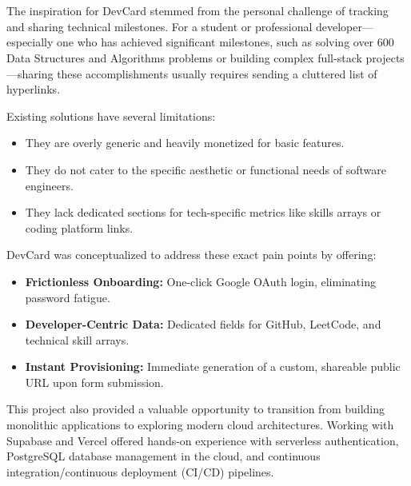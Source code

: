 \documentclass[12pt,a4paper]{report}     %
\begin{document}
\chapter{}
\begin{normalsize}

The inspiration for DevCard stemmed from the personal challenge of tracking and sharing technical milestones. For a student or professional developer—especially one who has achieved significant milestones, such as solving over 600 Data Structures and Algorithms problems or building complex full-stack projects—sharing these accomplishments usually requires sending a cluttered list of hyperlinks. 

Existing solutions have several limitations:

\begin{itemize}
    \item They are overly generic and heavily monetized for basic features.
    \item They do not cater to the specific aesthetic or functional needs of software engineers.
    \item They lack dedicated sections for tech-specific metrics like skills arrays or coding platform links.
\end{itemize}

DevCard was conceptualized to address these exact pain points by offering:

\begin{itemize}
    \item \textbf{Frictionless Onboarding:} One-click Google OAuth login, eliminating password fatigue.
    \item \textbf{Developer-Centric Data:} Dedicated fields for GitHub, LeetCode, and technical skill arrays.
    \item \textbf{Instant Provisioning:} Immediate generation of a custom, shareable public URL upon form submission.
\end{itemize}

This project also provided a valuable opportunity to transition from building monolithic applications to exploring modern cloud architectures. Working with Supabase and Vercel offered hands-on experience with serverless authentication, PostgreSQL database management in the cloud, and continuous integration/continuous deployment (CI/CD) pipelines.

\end{normalsize}

\end{document}
